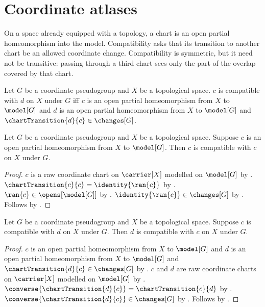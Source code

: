 \section{Coordinate atlases}




On a space already equipped with a topology, a chart is an open partial
homeomorphism into the model. Compatibility asks that its transition to
another chart be an allowed coordinate change. Compatibility is symmetric,
but it need not be transitive: passing through a third chart sees only the
part of the overlap covered by that chart.

\begin{definition}\label{coordinate_chart_compatibility}
    Let $G$ be a coordinate pseudogroup and $X$ be a topological space.
    $c$ is compatible with $d$ on $X$ under $G$ iff
        $c$ is an open partial homeomorphism from $X$ to $\model[G]$ and
        $d$ is an open partial homeomorphism from $X$ to $\model[G]$ and
        $\chartTransition{d}{c}\in\changes[G]$.
\end{definition}

\begin{theorem}\label{coordinate_chart_compatibility_reflexive}
    Let $G$ be a coordinate pseudogroup and $X$ be a topological space.
    Suppose $c$ is an open partial homeomorphism from $X$ to $\model[G]$.
    Then $c$ is compatible with $c$ on $X$ under $G$.
\end{theorem}
\begin{proof}
    $c$ is a raw coordinate chart on $\carrier[X]$ modelled on $\model[G]$ by
        .
    $\chartTransition{c}{c}=\identity{\ran{c}}$ by .
    $\ran{c}\in\opens[\model[G]]$ by .
    $\identity{\ran{c}}\in\changes[G]$ by .
    Follows by .
\end{proof}

\begin{theorem}\label{coordinate_chart_compatibility_symmetric}
    Let $G$ be a coordinate pseudogroup and $X$ be a topological space.
    Suppose $c$ is compatible with $d$ on $X$ under $G$.
    Then $d$ is compatible with $c$ on $X$ under $G$.
\end{theorem}
\begin{proof}
    $c$ is an open partial homeomorphism from $X$ to $\model[G]$ and
        $d$ is an open partial homeomorphism from $X$ to $\model[G]$ and
        $\chartTransition{d}{c}\in\changes[G]$ by
        .
    $c$ and $d$ are raw coordinate charts on $\carrier[X]$ modelled on
        $\model[G]$ by .
    $\converse{\chartTransition{d}{c}}=\chartTransition{c}{d}$ by
        .
    $\converse{\chartTransition{d}{c}}\in\changes[G]$ by .
    Follows by .
\end{proof}


